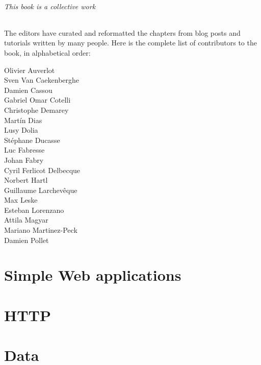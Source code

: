 \documentclass[10pt,twoside,english]{support/latex/sbabook/sbabook}
\begin{document}
\paragraph{This book is a collective work}
The editors have curated and reformatted the chapters from blog posts
and tutorials written by many people. Here is the complete list of contributors
to the book, in alphabetical order:

\begin{multicols}{3}
Olivier Auverlot\\
Sven Van Caekenberghe\\
Damien Cassou\\
Gabriel Omar Cotelli\\
Christophe Demarey\\
Martín Dias\\
Lusy Dolia\\
Stéphane Ducasse\\
Luc Fabresse\\
Johan Fabry\\
Cyril Ferlicot Delbecque\\
Norbert Hartl\\
Guillaume Larchevêque\\
Max Leske\\
Esteban Lorenzano\\
Attila Magyar\\
Mariano Martinez-Peck\\
Damien Pollet\\
\end{multicols}

\tableofcontents*
\clearpage\listoffigures

\mainmatter

\part{Simple Web applications}



\part{HTTP}





\part{Data}





\end{document}
